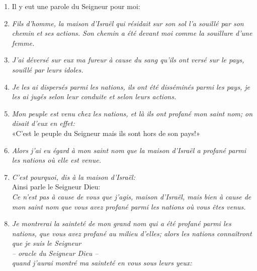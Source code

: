 \begin{enumerate}[leftmargin=\psleftmargin, labelsep = \pslabelsep, label={\arabic*}, font=\color{\pscolor}\small\textsuperscript, parsep=0em, itemsep=0em, topsep=0em ]
        \subsection*{Promesses de restauration nationale et spirituelle}
  \item {}Il y eut une parole du Seigneur pour moi:
  \item {}\textit{Fils d’homme, la maison d’Israël qui résidait sur son sol \brk
          l’a souillé par son chemin et ses actions. \brk
          Son chemin a été devant moi comme la souillure d’une femme.}
  \item {}\textit{J’ai déversé sur eux ma fureur \brk
          à cause du sang qu’ils ont versé sur le pays, \brk
          souillé par leurs idoles.}
  \item {}\textit{Je les ai dispersés parmi les nations, \brk
          ils ont été disséminés parmi les pays, \brk
          je les ai jugés selon leur conduite et selon leurs actions.}
  \item {}\textit{Mon peuple est venu chez les nations, \brk
          et là ils ont profané mon saint nom; \brk
          on disait d’eux en effet:} \\
        «C’est le peuple du Seigneur \brk
        mais ils sont hors de son pays!»
  \item {}\textit{Alors j’ai eu égard à mon saint nom \brk
          que la maison d’Israël a profané \brk
          parmi les nations où elle est venue.} \parSpace
  \item {}\textit{C’est pourquoi, dis à la maison d’Israël:} \\
        Ainsi parle le Seigneur Dieu: \\
        \textit{Ce n’est pas à cause de vous que j’agis, maison d’Israël, \brk
          mais bien à cause de mon saint nom \brk
          que vous avez profané parmi les nations où vous êtes venus.}
  \item {}\textit{Je montrerai la sainteté de mon grand nom \brk
          qui a été profané parmi les nations, \brk
          que vous avez profané au milieu d’elles; \brk
          alors les nations connaîtront que je suis le Seigneur \\
          – oracle du Seigneur Dieu – \\
          quand j’aurai montré ma sainteté en vous sous leurs yeux:}

\end{enumerate}
